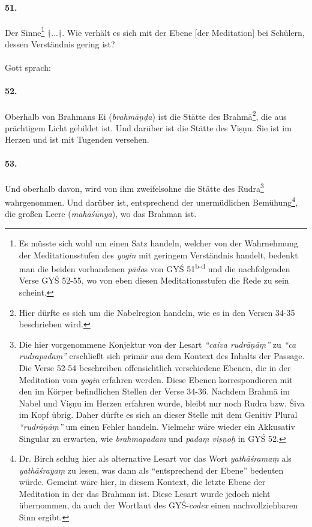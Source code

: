 \documentclass[a4paper,12pt]{article}
\begin{document}
\paragraph{51.} Der Sinne\footnote{Es müsste sich wohl um einen Satz handeln, welcher von der Wahrnehmung der Meditationsstufen des \textit{yogin} mit geringem Verständnis handelt, bedenkt man die beiden vorhandenen \textit{pāda}s von GYŚ 51\textsuperscript{b-d} und die nachfolgenden Verse GYŚ 52-55, wo von eben diesen Meditationsstufen die Rede zu sein scheint.} †...†. Wie verhält es sich mit der Ebene [der Meditation] bei Schülern, dessen Verständnis gering ist? 
\\ 
\\
\noindent Gott sprach:

\paragraph{52.} Oberhalb von Brahmans Ei (\textit{brahmāṇḍa}) ist die Stätte des Brahmā\footnote{Hier dürfte es sich um die Nabelregion handeln, wie es in den Versen 34-35 beschrieben wird.}, die aus prächtigem Licht gebildet ist. Und darüber ist die Stätte des Viṣṇu. Sie ist im Herzen und ist mit Tugenden versehen.

\paragraph{53.} Und oberhalb davon, wird von ihm zweifelsohne die Stätte des Rudra\footnote{Die hier vorgenommene Konjektur von der Lesart \textit{``caiva rudrāṇāṃ''} zu \textit{``ca rudrapadaṃ''} erschließt sich primär aus dem Kontext des Inhalts der Passage. Die Verse 52-54 beschreiben offensichtlich verschiedene Ebenen, die in der Meditation vom \textit{yogin} erfahren werden. Diese Ebenen korrespondieren mit den im Körper befindlichen Stellen der Verse 34-36. Nachdem Brahmā im Nabel und Viṣṇu im Herzen erfahren wurde, bleibt nur noch Rudra bzw. Śiva im Kopf übrig. Daher dürfte es sich an dieser Stelle mit dem Genitiv Plural \textit{``rudrāṇāṃ''} um einen Fehler handeln. Vielmehr wäre wieder ein Akkusativ Singular zu erwarten, wie \textit{brahmapadam} und \textit{padaṃ viṣṇoḥ} in GYŚ 52.} wahrgenommen. Und darüber ist, entsprechend der unermüdlichen Bemühung\footnote{Dr. Birch schlug hier als alternative Lesart vor das Wort \textit{yathāśramaṃ} als \textit{yathāśrayaṃ} zu lesen, was dann als ``entsprechend der Ebene'' bedeuten würde. Gemeint wäre hier, in diesem Kontext, die letzte Ebene der Meditation in der das Brahman ist. Diese Lesart wurde jedoch nicht übernommen, da auch der Wortlaut des GYŚ-\textit{codex} einen nachvollziehbaren Sinn ergibt.}, die großen Leere (\textit{mahāśūnya}), wo das Brahman ist.
\end{document}
